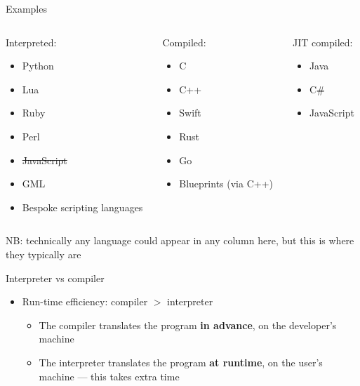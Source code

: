 \begin{frame}{Examples}
	\begin{columns}[t,onlytextwidth]
		\begin{column}{0.3\textwidth}
		    Interpreted:
		    \begin{itemize}
		        \item Python
		        \item Lua
		        \item Ruby
		        \item Perl
				\item \sout{JavaScript}
				\item GML
		        \item Bespoke scripting languages
		    \end{itemize}
		\end{column} \pause
		\begin{column}{0.3\textwidth}
		    Compiled:
		    \begin{itemize}
		        \item C
		        \item C++
		        \item Swift
		        \item Rust
		        \item Go
		        \item Blueprints (via C++)
		    \end{itemize}
		\end{column} \pause
		\begin{column}{0.3\textwidth}
		    JIT compiled:
		    \begin{itemize}
		        \item Java
		        \item C\#
		        \item JavaScript
		    \end{itemize}
		\end{column}
	\end{columns}
	\vspace{1ex}
	\pause NB: technically any language could appear in any column here, but this is where they typically are
\end{frame}

\begin{frame}{Interpreter vs compiler}
    \begin{itemize}
        \item Run-time efficiency: compiler $>$ interpreter \pause
        \begin{itemize}
            \item The compiler translates the program \textbf{in advance}, on the developer's machine \pause
            \item The interpreter translates the program \textbf{at runtime}, on the user's machine --- this takes extra time
        \end{itemize}
    \end{itemize}
\end{frame}

